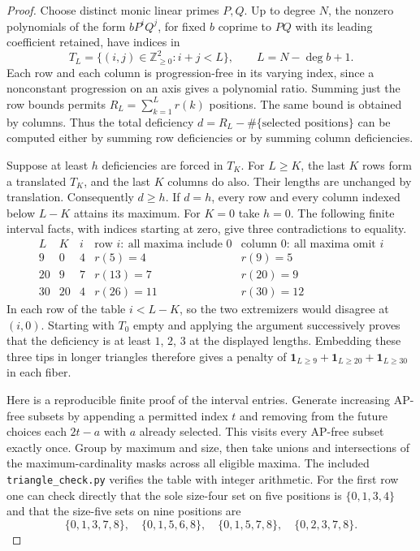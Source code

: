 \begin{proof}
Choose distinct monic linear primes $P,Q$. Up to degree $N$, the nonzero polynomials of the form $bP^iQ^j$, for fixed $b$ coprime to $PQ$ with its leading coefficient retained, have indices in
\[
 T_L=\{(i,j)\in\mathbb Z_{\ge0}^2:i+j<L\},\qquad L=N-\deg b+1.
\]
Each row and each column is progression-free in its varying index, since a nonconstant progression on an axis gives a polynomial ratio. Summing just the row bounds permits $R_L=\sum_{k=1}^L r(k)$ positions. The same bound is obtained by columns. Thus the total deficiency $d=R_L-\#\{\text{selected positions}\}$ can be computed either by summing row deficiencies or by summing column deficiencies.

Suppose at least $h$ deficiencies are forced in $T_K$. For $L\ge K$, the last $K$ rows form a translated $T_K$, and the last $K$ columns do also. Their lengths are unchanged by translation. Consequently $d\ge h$. If $d=h$, every row and every column indexed below $L-K$ attains its maximum. For $K=0$ take $h=0$. The following finite interval facts, with indices starting at zero, give three contradictions to equality.
\[
\begin{array}{c|c|c|c|c}
 L&K&i&\text{row }i:\ \text{all maxima include }0&
         \text{column }0:\ \text{all maxima omit }i\\ \hline
 9&0&4 &r(5)=4&r(9)=5\\
 20&9&7&r(13)=7&r(20)=9\\
 30&20&4&r(26)=11&r(30)=12
\end{array}
\]
In each row of the table $i<L-K$, so the two extremizers would disagree at $(i,0)$. Starting with $T_0$ empty and applying the argument successively proves that the deficiency is at least $1$, $2$, $3$ at the displayed lengths. Embedding these three tips in longer triangles therefore gives a penalty of $\mathbf 1_{L\ge9}+\mathbf 1_{L\ge20}+\mathbf 1_{L\ge30}$ in each fiber.

Here is a reproducible finite proof of the interval entries. Generate increasing AP-free subsets by appending a permitted index $t$ and removing from the future choices each $2t-a$ with $a$ already selected. This visits every AP-free subset exactly once. Group by maximum and size, then take unions and intersections of the maximum-cardinality masks across all eligible maxima. The included \texttt{triangle\_check.py} verifies the table with integer arithmetic. For the first row one can check directly that the sole size-four set on five positions is $\{0,1,3,4\}$ and that the size-five sets on nine positions are
\[
 \{0,1,3,7,8\},\quad \{0,1,5,6,8\},\quad
 \{0,1,5,7,8\},\quad \{0,2,3,7,8\}.
\]


\end{proof}
